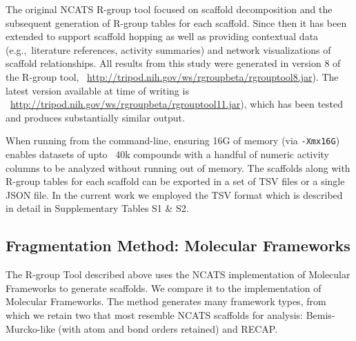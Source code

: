 \documentclass[journal=jacsat,manuscript=article]{achemso}
\newcommand*\sref[1]{Section~\ref{sec:#1}}
\newcommand*\eg{e.g.,~}
\begin{document}
The original NCATS R-group tool focused on scaffold decomposition and
the subsequent generation of R-group tables for each scaffold. Since
then it has been extended to support scaffold hopping as well as
providing contextual data (\eg literature references, activity
summaries) and network visualizations of scaffold relationships. All
results from this study were generated in version 8 of the R-group tool,
~\url{http://tripod.nih.gov/ws/rgroupbeta/rgrouptool8.jar}). The
latest version available at time of writing is
~\url{http://tripod.nih.gov/ws/rgroupbeta/rgrouptool11.jar}), which has been
tested and produces substantially similar output.

When running from the command-line, ensuring 16G of memory (via
\texttt{-Xmx16G}) enables datasets of upto ~40k compounds with a
handful of numeric activity columns to be analyzed without running out
of memory. The scaffolds along with R-group tables for each scaffold
can be exported in a set of TSV files or a single JSON file. In the
current work we employed the TSV format which is described in detail
in Supplementary Tables S1 \& S2.

\subsection{Fragmentation Method: Molecular Frameworks}
\label{sec:gskframe}
The R-group Tool described above uses the NCATS implementation of
Molecular Frameworks to generate scaffolds. We compare it to the
\citet{Harper2004DDclus} implementation of Molecular Frameworks.
The method generates many framework types, from which we retain two that
most resemble NCATS scaffolds for analysis: Bemis-Murcko-like\cite{BemisMurcko1996}
(with atom and bond orders retained) and RECAP\cite{Lewell:1998aa}. 


\end{document}
